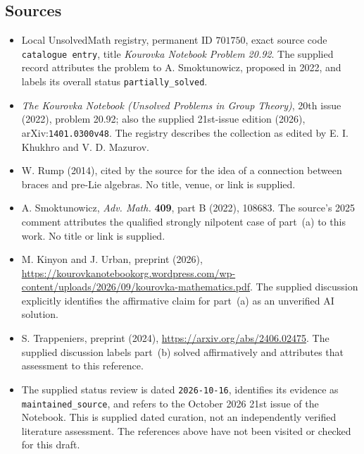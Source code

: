 \documentclass[11pt]{article}
\begin{document}
\subsection{Sources}
\begin{itemize}
\item Local UnsolvedMath registry, permanent ID \(701750\), exact source code \texttt{catalogue entry}, title \emph{Kourovka Notebook Problem 20.92}. The supplied record attributes the problem to A. Smoktunowicz, proposed in 2022, and labels its overall status \texttt{partially\_solved}.
\item \emph{The Kourovka Notebook (Unsolved Problems in Group Theory)}, 20th issue (2022), problem 20.92; also the supplied 21st-issue edition (2026), arXiv:\texttt{1401.0300v48}. The registry describes the collection as edited by E. I. Khukhro and V. D. Mazurov.
\item W. Rump (2014), cited by the source for the idea of a connection between braces and pre-Lie algebras. No title, venue, or link is supplied.
\item A. Smoktunowicz, \emph{Adv. Math.} \textbf{409}, part B (2022), 108683. The source's 2025 comment attributes the qualified strongly nilpotent case of part~(a) to this work. No title or link is supplied.
\item M. Kinyon and J. Urban, preprint (2026), \url{https://kourovkanotebookorg.wordpress.com/wp-content/uploads/2026/09/kourovka-mathematics.pdf}. The supplied discussion explicitly identifies the affirmative claim for part~(a) as an unverified AI solution.
\item S. Trappeniers, preprint (2024), \url{https://arxiv.org/abs/2406.02475}. The supplied discussion labels part~(b) solved affirmatively and attributes that assessment to this reference.
\item The supplied status review is dated \texttt{2026-10-16}, identifies its evidence as \texttt{maintained\_source}, and refers to the October 2026 21st issue of the Notebook. This is supplied dated curation, not an independently verified literature assessment. The references above have not been visited or checked for this draft.
\end{itemize}
\end{document}
